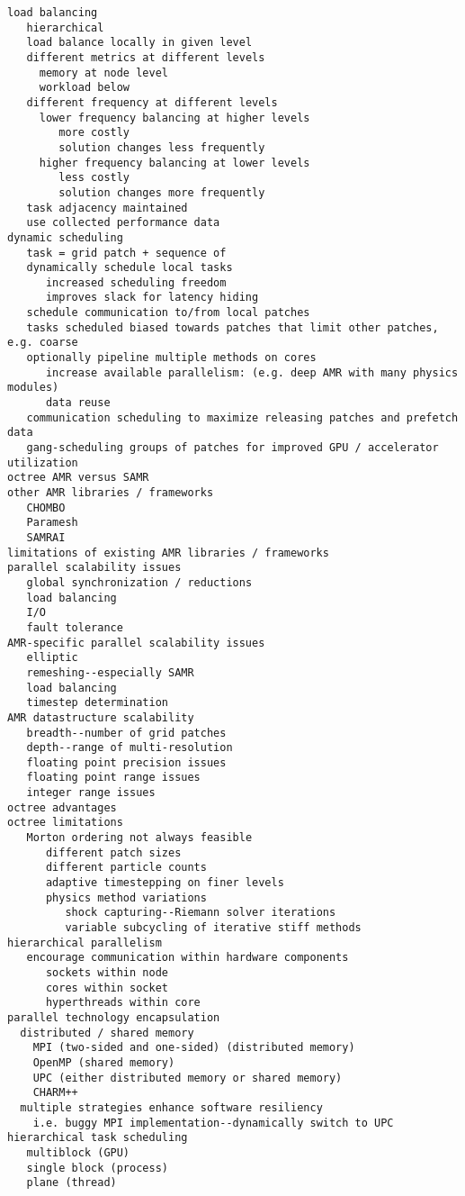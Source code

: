 \documentclass{article}
\begin{document}
\begin{verbatim}
load balancing
   hierarchical
   load balance locally in given level
   different metrics at different levels
     memory at node level
     workload below
   different frequency at different levels
     lower frequency balancing at higher levels
        more costly
        solution changes less frequently
     higher frequency balancing at lower levels
        less costly
        solution changes more frequently
   task adjacency maintained
   use collected performance data
dynamic scheduling
   task = grid patch + sequence of 
   dynamically schedule local tasks
      increased scheduling freedom
      improves slack for latency hiding
   schedule communication to/from local patches
   tasks scheduled biased towards patches that limit other patches, e.g. coarse
   optionally pipeline multiple methods on cores
      increase available parallelism: (e.g. deep AMR with many physics modules)
      data reuse
   communication scheduling to maximize releasing patches and prefetch data
   gang-scheduling groups of patches for improved GPU / accelerator utilization
octree AMR versus SAMR   
other AMR libraries / frameworks
   CHOMBO
   Paramesh
   SAMRAI
limitations of existing AMR libraries / frameworks
parallel scalability issues
   global synchronization / reductions
   load balancing
   I/O
   fault tolerance
AMR-specific parallel scalability issues
   elliptic
   remeshing--especially SAMR
   load balancing
   timestep determination
AMR datastructure scalability
   breadth--number of grid patches
   depth--range of multi-resolution
   floating point precision issues
   floating point range issues
   integer range issues
octree advantages
octree limitations
   Morton ordering not always feasible
      different patch sizes
      different particle counts
      adaptive timestepping on finer levels
      physics method variations
         shock capturing--Riemann solver iterations
         variable subcycling of iterative stiff methods
hierarchical parallelism
   encourage communication within hardware components
      sockets within node
      cores within socket
      hyperthreads within core
parallel technology encapsulation
  distributed / shared memory
    MPI (two-sided and one-sided) (distributed memory)
    OpenMP (shared memory) 
    UPC (either distributed memory or shared memory)
    CHARM++
  multiple strategies enhance software resiliency
    i.e. buggy MPI implementation--dynamically switch to UPC
hierarchical task scheduling
   multiblock (GPU)
   single block (process)
   plane (thread)

\end{verbatim}
\end{document}
